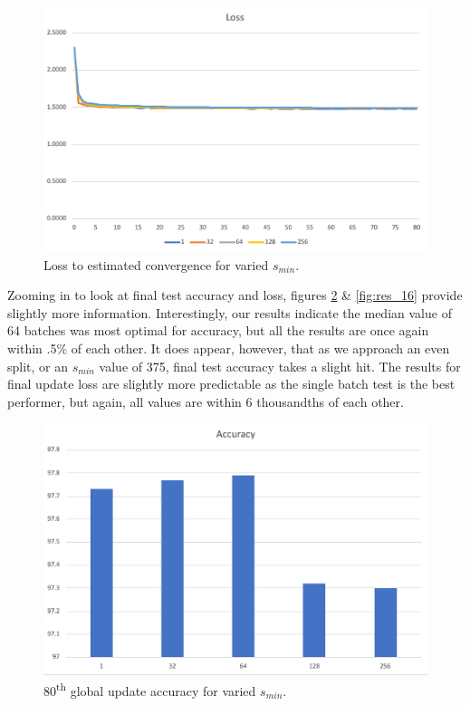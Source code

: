 \documentclass[../mthe-493-final-project.tex]{subfiles}
\begin{document}
    \begin{figure}
        \centering
        \includegraphics[width=150mm]{thesis/img/res_14.png}
        \caption{Loss to estimated convergence for varied $s_{min}$.}
        \label{fig:res_14}
    \end{figure}
    Zooming in to look at final test accuracy and loss, figures \ref{fig:res_15} \& \ref{fig:res_16} provide slightly more information. Interestingly, our results indicate the median value of 64 batches was most optimal for accuracy, but all the results are once again within .5\% of each other. It does appear, however, that as we approach an even split, or an $s_{min}$ value of 375, final test accuracy takes a slight hit. The results for final update loss are slightly more predictable as the single batch test is the best performer, but again, all values are within 6 thousandths of each other. 
    \begin{figure}
        \centering
        \includegraphics[width=150mm]{thesis/img/res_15.png}
        \caption{80\textsuperscript{th} global update accuracy for varied $s_{min}$.}
        \label{fig:res_15}
    \end{figure}
\end{document}
